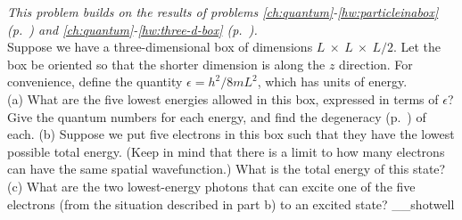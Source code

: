 \emph{This problem builds on the results of problems \ref{ch:quantum}-\ref{hw:particleinabox}
(p.~\pageref{hw:particleinabox}) and \ref{ch:quantum}-\ref{hw:three-d-box}
(p.~\pageref{hw:three-d-box}).}\\
Suppose we have a three-dimensional box of dimensions $L\ \times\ L\ \times\ L/2$.
Let the box be oriented so that the shorter dimension is along the $z$ direction.
For convenience, define the quantity $\epsilon=h^2/8mL^2$, which has units of energy.\\
(a) What are the five lowest energies allowed in this box, expressed in terms of
$\epsilon$? Give the quantum numbers for each energy,
and find the degeneracy (p.~\pageref{subsubsec:degeneracy}) of each.\hwendpart
(b) Suppose we put five electrons in this box such that they have the lowest
possible total energy. (Keep in
mind that there is a limit to how many electrons can have the same spatial wavefunction.) What is the
total energy of this state?\answercheck\hwendpart
(c) What are the two lowest-energy photons that can excite one of the five electrons (from the situation
described in part b) to an excited state?\answercheck\hwendpart
__shotwell
